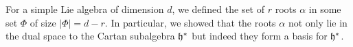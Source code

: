 For a simple Lie algebra of dimension $d$, we defined the set of $r$ roots $\alpha$ in some set $\Phi$ of size $|\Phi|=d-r$. In particular, we showed that the roots $\alpha$ not only lie in the dual space to the Cartan subalgebra $\mathfrak{h}^*$ but indeed they form a basis for $\mathfrak{h}^*$.